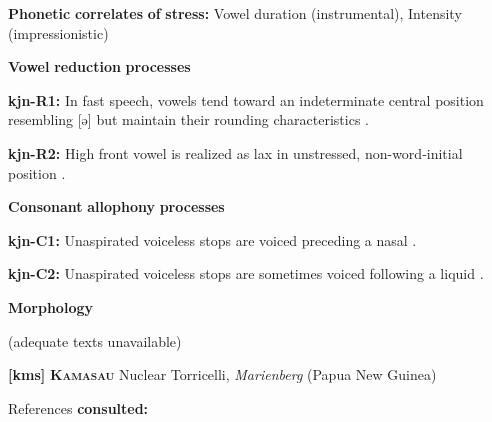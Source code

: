 \begin{styleBody}
\textbf{Phonetic} \textbf{correlates} \textbf{of} \textbf{stress:} Vowel duration (instrumental), Intensity (impressionistic)
\end{styleBody}

\begin{styleBody}
\textbf{Vowel} \textbf{reduction} \textbf{processes}
\end{styleBody}

\begin{styleBody}
\textbf{kjn-R1:} In fast speech, vowels tend toward an indeterminate central position resembling [ə] but maintain their rounding characteristics \citep[41]{Sommer1969}.
\end{styleBody}

\begin{styleBody}
\textbf{kjn-R2:} High front vowel is realized as lax in unstressed, non-word-initial position \citep[41]{Sommer1969}.
\end{styleBody}

\begin{styleBody}
\textbf{Consonant} \textbf{allophony} \textbf{processes}
\end{styleBody}

\begin{styleBody}
\textbf{kjn-C1:} Unaspirated voiceless stops are voiced preceding a nasal \citep[39]{Sommer1969}.
\end{styleBody}

\begin{styleBody}
\textbf{kjn-C2:} Unaspirated voiceless stops are sometimes voiced following a liquid \citep[39]{Sommer1969}.
\end{styleBody}

\begin{styleBody}
\textbf{Morphology}
\end{styleBody}

\begin{styleBody}
(adequate texts unavailable)
\end{styleBody}

\begin{styleBody}
\textbf{[kms]}   \textbf{\textsc{Kamasau}}  Nuclear Torricelli, \textit{Marienberg} (Papua New Guinea)
\end{styleBody}

\begin{styleBody}
References \textbf{consulted:} \citet{SandersSanders1980}
\end{styleBody}

